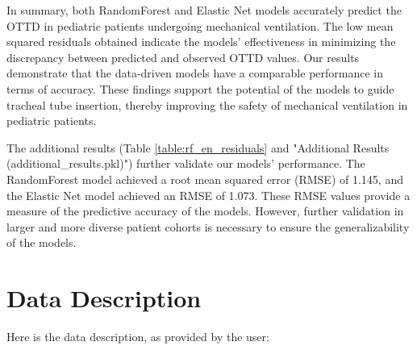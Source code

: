 \documentclass[11pt]{article}
\begin{document}
In summary, both RandomForest and Elastic Net models accurately predict the OTTD in pediatric patients undergoing mechanical ventilation. The low mean squared residuals obtained indicate the models' effectiveness in minimizing the discrepancy between predicted and observed OTTD values. Our results demonstrate that the data-driven models have a comparable performance in terms of accuracy. These findings support the potential of the models to guide tracheal tube insertion, thereby improving the safety of mechanical ventilation in pediatric patients.

The additional results (Table \ref{table:rf_en_residuals} and "Additional Results (additional\_results.pkl)") further validate our models' performance. The RandomForest model achieved a root mean squared error (RMSE) of 1.145, and the Elastic Net model achieved an RMSE of 1.073. These RMSE values provide a measure of the predictive accuracy of the models. However, further validation in larger and more diverse patient cohorts is necessary to ensure the generalizability of the models.


\clearpage
\appendix

\section{Data Description} \label{sec:data_description} Here is the data description, as provided by the user:
\end{document}
